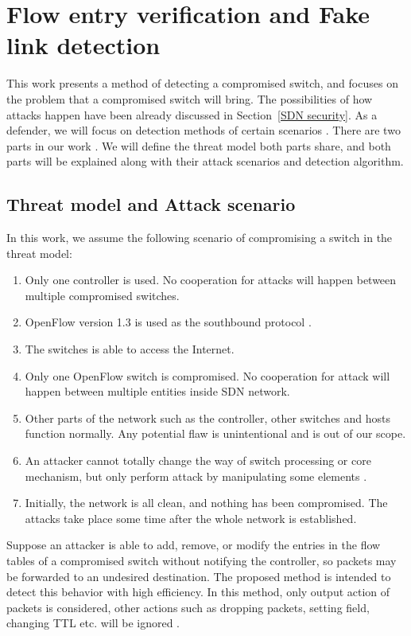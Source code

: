 \chapter{Flow entry verification and Fake link detection}
This work presents a method of detecting a compromised switch, and focuses on the problem that a compromised switch will bring. The possibilities of how attacks  happen have been already discussed in Section~\ref{SDN security}. As a defender, we will focus on detection methods of certain scenarios . There are two parts in our work . We will define the threat model both parts share, and both parts will be explained along with their attack scenarios and detection algorithm.

\section{Threat model and Attack scenario}
In this work, we assume the following scenario of compromising a switch in the threat model:
\begin{enumerate}
\item
Only one controller is used. No cooperation for attacks will happen between multiple compromised switches.
\item
OpenFlow version 1.3 is used as the southbound protocol .
\item
The switches is able to access the Internet. 
\item
Only one OpenFlow switch is compromised. No cooperation for attack will happen between multiple entities inside SDN network. 
\item
Other parts of the network such as the controller, other switches and hosts function normally. Any potential flaw is unintentional and is out of our scope.
\item
An attacker cannot totally change the way of switch processing or core mechanism, but only perform attack by manipulating some elements  .
\item
Initially, the network is all clean, and nothing has been compromised. The attacks take place some time after the whole network is established.
\end{enumerate}

Suppose an attacker is able to add, remove, or modify the entries in the flow tables of a compromised
switch without notifying the controller, so packets may be forwarded to an undesired destination. The proposed method is intended to detect this behavior with high efficiency. In this method, only output action of packets is considered, other actions such as dropping packets, setting field, changing TTL etc. will be ignored . 

